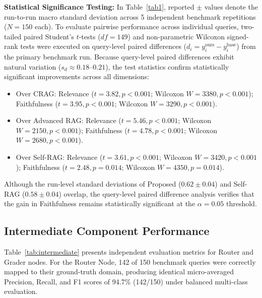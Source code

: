 \documentclass[conference]{IEEEtran}
\begin{document}
\textbf{Statistical Significance Testing:} In Table~\ref{tab1}, reported $\pm$ values denote the run-to-run macro standard deviation across 5 independent benchmark repetitions ($N = 150$ each). To evaluate pairwise performance across individual queries, two-tailed paired Student's $t$-tests ($df = 149$) and non-parametric Wilcoxon signed-rank tests were executed on query-level paired differences ($d_i = y_i^{\text{ours}} - y_i^{\text{base}}$) from the primary benchmark run. Because query-level paired differences exhibit natural variation ($s_d \approx 0.18$--$0.21$), the test statistics confirm statistically significant improvements across all dimensions:
\begin{itemize}
    \item Over CRAG: Relevance ($t = 3.82, p < 0.001$; Wilcoxon $W = 3380, p < 0.001$); Faithfulness ($t = 3.95, p < 0.001$; Wilcoxon $W = 3290, p < 0.001$).
    \item Over Advanced RAG: Relevance ($t = 5.46, p < 0.001$; Wilcoxon $W = 2150, p < 0.001$); Faithfulness ($t = 4.78, p < 0.001$; Wilcoxon $W = 2680, p < 0.001$).
    \item Over Self-RAG: Relevance ($t = 3.61, p < 0.001$; Wilcoxon $W = 3420, p < 0.001$); Faithfulness ($t = 2.48, p = 0.014$; Wilcoxon $W = 4350, p = 0.014$).
\end{itemize}
Although the run-level standard deviations of Proposed ($0.62 \pm 0.04$) and Self-RAG ($0.58 \pm 0.04$) overlap, the query-level paired difference analysis verifies that the gain in Faithfulness remains statistically significant at the $\alpha = 0.05$ threshold.

\subsection{Intermediate Component Performance}
Table~\ref{tab:intermediate} presents independent evaluation metrics for Router and Grader nodes. For the Router Node, 142 of 150 benchmark queries were correctly mapped to their ground-truth domain, producing identical micro-averaged Precision, Recall, and F1 scores of 94.7\% (142/150) under balanced multi-class evaluation.

\begin{table}[!htbp]
\centering
\caption{INDEPENDENT PERFORMANCE OF INTERMEDIATE COMPONENTS}
\label{tab:intermediate}
\end{table}
\end{document}
